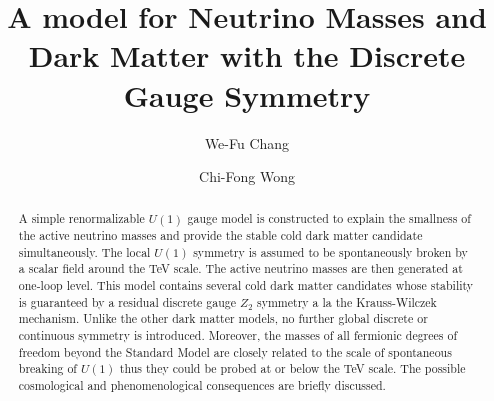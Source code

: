 \documentclass[aps,prd,preprint,nofootinbib]{revtex4}
\begin{document}
\title{A model for Neutrino Masses and Dark Matter with the Discrete Gauge Symmetry}

\author{We-Fu Chang}
\author{ Chi-Fong Wong}




\begin{abstract}
A simple renormalizable $U(1)$ gauge model is constructed to
explain  the smallness of the active neutrino masses  and provide
the stable cold dark matter candidate simultaneously. The local
$U(1)$ symmetry is assumed to be spontaneously broken by a scalar
field around the TeV scale. The active neutrino masses are then
generated at one-loop level. This model contains several cold dark
matter candidates whose stability is guaranteed  by a  residual
discrete gauge $Z_2$ symmetry a la the Krauss-Wilczek mechanism.
Unlike the other dark matter models, no further global discrete or
continuous symmetry is introduced. Moreover, the masses of all  fermionic
degrees of freedom beyond the Standard Model are closely related to
the scale of spontaneous breaking of $U(1)$ thus they could be probed at or below the TeV scale.
The possible cosmological and  phenomenological consequences are briefly discussed.

\end{abstract}
\maketitle
\end{document}
